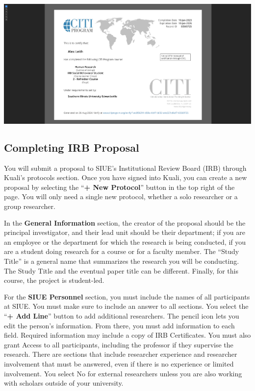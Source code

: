 \documentclass[
]{book}
\begin{document}
\href{https://www.linkedin.com/in/apleith/details/certifications/}{\includegraphics{images/irb-cert.png}}

\subsection*{Completing IRB Proposal}\label{completing-irb-proposal}

You will submit a proposal to SIUE's Institutional Review Board (IRB) through Kuali's protocols section. Once you have signed into Kuali, you can create a new proposal by selecting the ``\textbf{+ New Protocol}'' button in the top right of the page. You will only need a single new protocol, whether a solo researcher or a group researcher.

In the \textbf{General Information} section, the creator of the proposal should be the principal investigator, and their lead unit should be their department; if you are an employee or the department for which the research is being conducted, if you are a student doing research for a course or for a faculty member. The ``Study Title'' is a general name that summarizes the research you will be conducting. The Study Title and the eventual paper title can be different. Finally, for this course, the project is student-led.

For the \textbf{SIUE Personnel} section, you must include the names of all participants at SIUE. You must make sure to include an answer to all sections. You select the ``\textbf{+ Add Line}'' button to add additional researchers. The pencil icon lets you edit the person's information. From there, you must add information to each field. Required information may include a copy of IRB Certificates. You must also grant Access to all participants, including the professor if they supervise the research. There are sections that include researcher experience and researcher involvement that must be answered, even if there is no experience or limited involvement. You select No for external researchers unless you are also working with scholars outside of your university.
\end{document}
